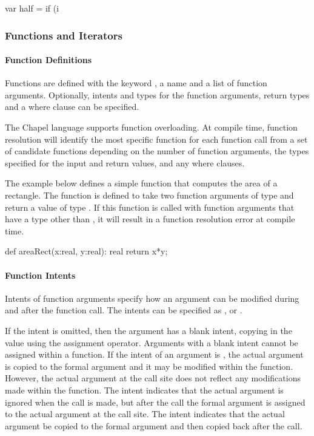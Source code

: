 \begin{example}
\begin{chapel}
var half = if (i %
\end{chapel}
\end{example}

\subsubsection{Functions and Iterators}
\paragraph{Function Definitions}
Functions are defined with the keyword , a name and a list of function
arguments.  Optionally, intents and types for the function arguments, return types and 
a where clause can be specified.  

The Chapel language supports function overloading.  At compile time, function
resolution will identify the most specific function for each function call from a set
of candidate functions depending on the number of function arguments, the types 
specified for the input and return values, and any where clauses.

\begin{example}
The example below defines a simple function that computes the area of a rectangle.
The  function is defined to take two function arguments of type
 and return a value of type .  If this function is called with 
function arguments that have a type other than , it will result in a function
resolution error at compile time.
\begin{chapel}
def areaRect(x:real, y:real): real {
  return x*y;
}
\end{chapel}
\end{example}

\paragraph{Function Intents}
Intents of function arguments specify how an argument can be
modified during and after the function call. 
The intents can be specified as ,  or .

If the intent is omitted, then the
argument has a blank intent, copying in the value using the assignment 
operator.  Arguments with a blank intent cannot be assigned within a function.
If the intent of an argument is , the actual argument is copied 
to the formal argument and it may be modified within the function.  However, 
the actual argument at the call site does not reflect any modifications 
made within the function.  The  intent indicates that the 
actual argument is ignored when the call is made, but after the
call the formal argument is assigned to the actual argument at the call site.
The  intent indicates that the actual argument be copied to 
the formal argument and then copied back after the call.


